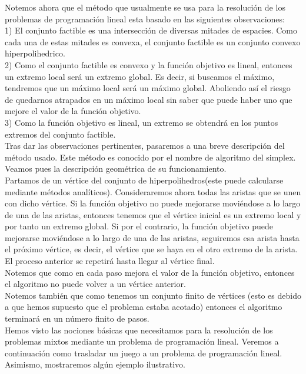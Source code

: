 \documentclass[10pt,a4paper]{book}
\begin{document}
Notemos ahora que el método que usualmente se usa para la resolución de los problemas de programación lineal esta basado en las siguientes observaciones:\\

1) El conjunto factible es una intersección de diversas mitades de espacies. Como cada una de estas mitades es convexa, el conjunto factible es un conjunto convexo hiperpolihedrico.\\

2) Como el conjunto factible es convexo y la función objetivo es lineal, entonces un extremo local será un extremo global. Es decir, si buscamos el máximo, tendremos que un máximo local será un máximo global. Aboliendo así el riesgo de quedarnos atrapados en un máximo local sin saber que puede haber uno que mejore el valor de la función objetivo.\\

3) Como la función objetivo es lineal, un extremo se obtendrá en los puntos extremos del conjunto factible.\\

Tras dar las observaciones pertinentes, pasaremos a una breve descripción del método usado. Este método es conocido por el nombre de algoritmo del simplex. Veamos pues la descripción geométrica de su funcionamiento.\\

Partamos de un vértice del conjunto de hiperpolihedros(este puede calcularse mediante métodos analíticos). Consideraremos ahora todas las aristas que se unen con dicho vértice. Si la función objetivo no puede mejorarse moviéndose a lo largo de una de las aristas, entonces tenemos que el vértice inicial es un extremo local y por tanto un extremo global. Si por el contrario, la función objetivo puede mejorarse moviéndose a lo largo de una de las aristas, seguiremos esa arista hasta el próximo vértice, es decir, el vértice que se haya en el otro extremo de la arista. \\
El proceso anterior se repetirá hasta llegar al vértice final. \\
Notemos que como en cada paso mejora el valor de la función objetivo, entonces el algoritmo no puede volver a un vértice anterior.\\
Notemos también que como tenemos un conjunto finito de vértices (esto es debido a que hemos supuesto que el problema estaba acotado) entonces el algoritmo terminará en un número finito de pasos.\\


Hemos visto las nociones básicas que necesitamos para la resolución de los problemas mixtos mediante un problema de programación lineal. Veremos a continuación como trasladar un juego a un problema de programación lineal. Asimismo, mostraremos algún ejemplo ilustrativo.\\
\end{document}
